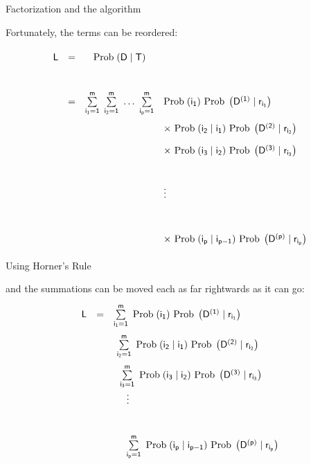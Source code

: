 \documentclass[bluish,slideColor,colorBG,pdf]{prosper}
\def\Prob{{\rm Prob\;}}
\begin{document}
\begin{slide}[Replace]{Factorization and the algorithm}
\bigskip

Fortunately, the terms can be reordered:
\[
\begin{array}{c c c l}
\mathsf{L}  & =  &   \mathsf{\Prob(D\;|\;T)}\\
& & \\
&  \mathsf{=} & \mathsf{\sum\limits_{i_1=1}^m\ \sum\limits_{i_2=1}^m\ \dots\ \sum\limits_{i_p=1}^m}
& \mathsf{\Prob(i_1)\ \Prob\left(D^{(1)}\;|\;r_{i_1}\right)}\\
& & &\mathsf{\times\ \Prob(i_2\;|\;i_1)\ \Prob\left(D^{(2)}\;|\;r_{i_2}\right)}\\
& & &\mathsf{\times\ \Prob(i_3\;|\;i_2)\ \Prob\left(D^{(3)}\;|\;r_{i_3}\right)}\\
& & &\\
& & &\mathsf{\vdots}\\
& & &\\
& & &\mathsf{\times\ \Prob(i_p\;|\;i_{p-1})\ \Prob\left(D^{(p)}\;|\;r_{i_p}\right)}
\end{array}
\]

\end{slide}

\begin{slide}[Replace]{Using Horner's Rule}
\bigskip

and the summations can be moved each as far rightwards as it
can go:
\[
\renewcommand{\arraystretch}{1.9}
\begin{array}{c c l}
\mathsf{L} & \mathsf{=}  & \mathsf{\sum\limits_{i_1=1}^m\ \Prob(i_1)\ \Prob\left(D^{(1)}\;|\;r_{i_1}\right)}\\
& & \raisebox{12pt}{\strut}\ \mathsf{\sum\limits_{i_2=1}^m\ \Prob(i_2\;|\;i_1)\ \Prob\left(D^{(2)}\;|\;r_{i_2}\right)}\\
& &\raisebox{12pt}{\strut} \ \ \mathsf{\sum\limits_{i_3=1}^m\ \Prob(i_3\;|\;i_2)\ \Prob\left(D^{(3)}\;|\;r_{i_3}\right)}\\
& &\ \ \ \ \mathsf{\vdots}\\
 & & \\
& & \ \ \ \ \mathsf{\sum\limits_{i_p=1}^m\ \Prob(i_p\;|\;i_{p-1})\ \Prob\left(D^{(p)}\;|\;r_{i_p}\right)}
\end{array}
\]

\end{slide}
\end{document}
